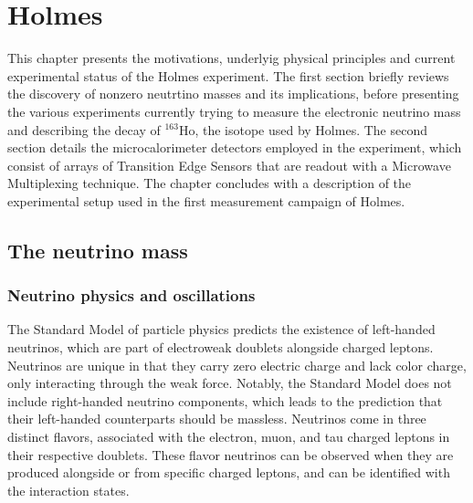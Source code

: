 \chapter{Holmes}
This chapter presents the motivations, underlyig physical principles and current experimental status of the Holmes
experiment. The first section briefly reviews the discovery of nonzero neutrtino masses and its implications, before
presenting the various experiments currently trying to measure the electronic neutrino mass and describing the decay of
$^{163}$Ho, the isotope used by Holmes. The second section details the microcalorimeter detectors employed in the experiment,
which consist of arrays of Transition Edge Sensors that are readout with a Microwave Multiplexing technique. The chapter concludes with a
description of the experimental setup used in the first measurement campaign of Holmes.
\section{The neutrino mass}
\subsection{Neutrino physics and oscillations}

The Standard Model of particle physics predicts the existence of left-handed neutrinos, which are part of
electroweak doublets alongside charged leptons. Neutrinos are unique in that they carry zero electric charge and lack
color charge, only interacting through the weak force. Notably, the Standard Model does not include right-handed neutrino components, which leads to the prediction that their left-handed counterparts should be massless.
Neutrinos come in three distinct flavors, associated with the electron, muon, and tau charged leptons in their
respective doublets. These flavor neutrinos can be observed when they are produced alongside or from specific charged
leptons, and can be identified with the interaction states.

